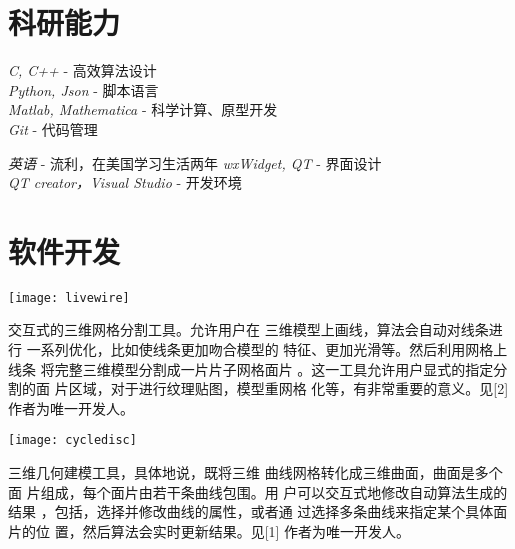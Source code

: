 \documentclass[20pt]{article} %
\begin{document}
\section{科研能力}

\begin{minipage}{0.5\textwidth}
\centering
{}
{
\textit{C, C++} - 高效算法设计\\
\textit{Python, Json} - 脚本语言\\
\textit{Matlab, Mathematica} - 科学计算、原型开发\\
\textit{Git} - 代码管理
}
\end{minipage}
\begin{minipage}{0.5\textwidth}
{
\textit{英语} -   流利，在美国学习生活两年
}
{
\textit{wxWidget, QT} - 界面设计\\
\textit{QT creator，Visual Studio} - 开发环境
}
\end{minipage}

\section{软件开发}

\begin{minipage}{0.5\textwidth}
{
\center
  \texttt{[image: livewire]}
}
\end{minipage}
\begin{minipage}{0.5\textwidth}
交互式的三维网格分割工具。允许用户在
三维模型上画线，算法会自动对线条进行
一系列优化，比如使线条更加吻合模型的
特征、更加光滑等。然后利用网格上线条
将完整三维模型分割成一片片子网格面片
。这一工具允许用户显式的指定分割的面
片区域，对于进行纹理贴图，模型重网格
化等，有非常重要的意义。见[2]\\%
作者为唯一开发人。
\end{minipage}


\begin{minipage}{0.5\textwidth}
{
\center
  \texttt{[image: cycledisc]}
}
\end{minipage}
\begin{minipage}{0.5\textwidth}
三维几何建模工具，具体地说，既将三维
曲线网格转化成三维曲面，曲面是多个面
片组成，每个面片由若干条曲线包围。用
户可以交互式地修改自动算法生成的结果
，包括，选择并修改曲线的属性，或者通
过选择多条曲线来指定某个具体面片的位
置，然后算法会实时更新结果。见[1]
作者为唯一开发人。\\
\end{minipage}
\end{document}
